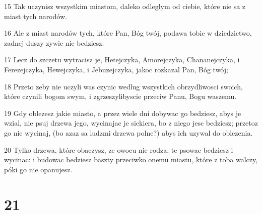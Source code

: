 \par 15 Tak uczynisz wszystkim miastom, daleko odleglym od ciebie, które nie sa z miast tych narodów.
\par 16 Ale z miast narodów tych, które Pan, Bóg twój, podawa tobie w dziedzictwo, zadnej duszy zywic nie bedziesz.
\par 17 Lecz do szczetu wytracisz je, Hetejczyka, Amorejczyka, Chananejczyka, i Ferezejczyka, Hewejczyka, i Jebuzejczyka, jakoc rozkazal Pan, Bóg twój;
\par 18 Przeto zeby nie uczyli was czynic wedlug wszystkich obrzydliwosci swoich, które czynili bogom swym, i zgrzeszylibyscie przeciw Panu, Bogu waszemu.
\par 19 Gdy oblezesz jakie miasto, a przez wiele dni dobywac go bedziesz, abys je wzial, nie psuj drzewa jego, wycinajac je siekiera, bo z niego jesc bedziesz; przetoz go nie wycinaj, (bo azaz sa ludzmi drzewa polne?) abys ich uzywal do oblezenia.
\par 20 Tylko drzewa, które obaczysz, ze owocu nie rodza, te psowac bedziesz i wycinac: i budowac bedziesz baszty przeciwko onemu miastu, które z toba walczy, póki go nie opanujesz.

\chapter{21}

